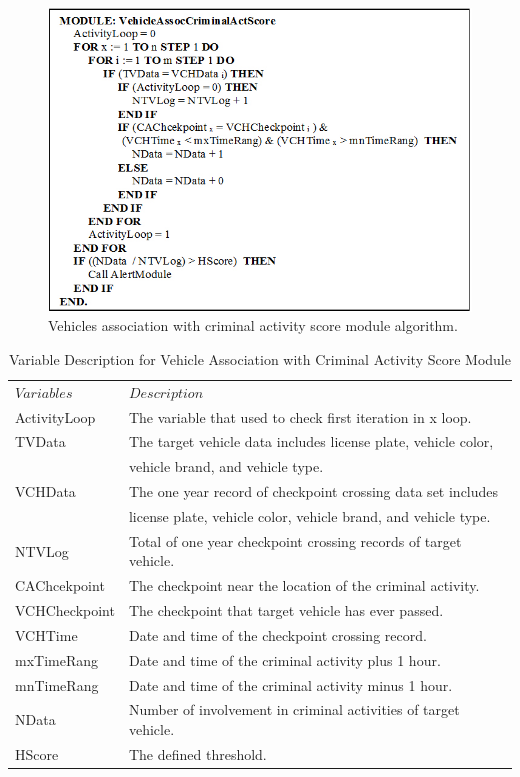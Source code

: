 \documentclass{llncs}
\begin{document}
\begin{figure}
\centering
\includegraphics[width=1\textwidth]{images/activityAlgorithm2.jpg}
\caption{Vehicles association with criminal activity score module algorithm.}
\label{fig:activityAlgo}
\end{figure}

\begin{table}
\caption{Variable Description for Vehicle Association with Criminal Activity Score Module}
\label{table_variableActivity}
\begin{center}
\renewcommand{\arraystretch}{1.4}
\setlength\tabcolsep{3pt}
\begin{tabular}{ll}
\hline\noalign{\smallskip}
$Variables$ & $Description$\\
\noalign{\smallskip}
\hline
\noalign{\smallskip}
ActivityLoop & The variable that used to check first iteration in x loop.\\
TVData & The target vehicle data includes license plate, 
vehicle color, \\ & vehicle brand, and vehicle type.\\
VCHData & The one year record of checkpoint crossing data set includes  \\ & license plate, vehicle color, vehicle brand, and vehicle type.\\
NTVLog & Total of one year checkpoint crossing records of target vehicle.\\
CAChcekpoint & The checkpoint near the location of the criminal activity.\\
VCHCheckpoint & The checkpoint that target vehicle has ever passed.\\
VCHTime & Date and time of the checkpoint crossing record.\\
mxTimeRang & Date and time of the criminal activity plus 1 hour.\\
mnTimeRang & Date and time of the criminal activity minus 1 hour.\\
NData & Number of involvement in criminal activities of target vehicle.\\
HScore & The defined threshold.\\
\hline
\end{tabular}
\end{center}
\end{table}
\end{document}
